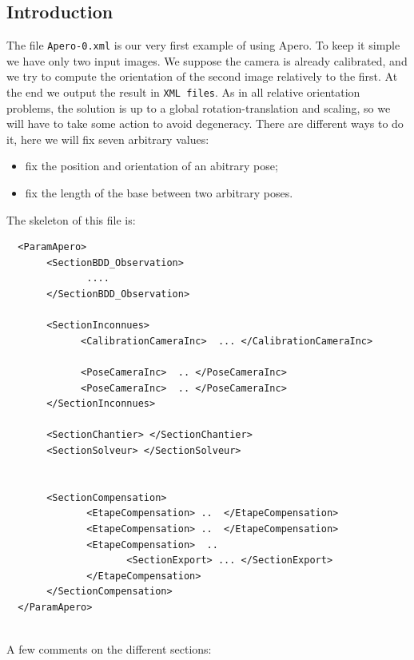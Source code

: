 \subsection{Introduction}

The file {\tt Apero-0.xml} is our very first example of using Apero.
To keep it simple we have only two input images. We suppose the camera
is already calibrated, and we try to compute the orientation
of the second image relatively to the first. At the end we output the result
in {\tt XML files}. As in all relative orientation problems, the solution
is  up to a global rotation-translation and scaling, so we will have to
take some action to avoid degeneracy. There are different ways to do it, here we will
fix seven arbitrary values:

\begin{itemize}
  \item  fix the position and orientation of an abitrary pose;
  \item  fix the length of the base between two arbitrary poses.
\end{itemize}





The skeleton of this file is:

{\scriptsize
\begin{verbatim}
  <ParamApero>
       <SectionBDD_Observation>
              ....
       </SectionBDD_Observation>

       <SectionInconnues>
             <CalibrationCameraInc>  ... </CalibrationCameraInc>

             <PoseCameraInc>  .. </PoseCameraInc>
             <PoseCameraInc>  .. </PoseCameraInc>
       </SectionInconnues>

       <SectionChantier> </SectionChantier>
       <SectionSolveur> </SectionSolveur>


       <SectionCompensation>
              <EtapeCompensation> ..  </EtapeCompensation>
              <EtapeCompensation> ..  </EtapeCompensation>
              <EtapeCompensation>  .. 
                     <SectionExport> ... </SectionExport>
              </EtapeCompensation>
       </SectionCompensation>
  </ParamApero>


\end{verbatim}
}

A few comments on the different sections:

